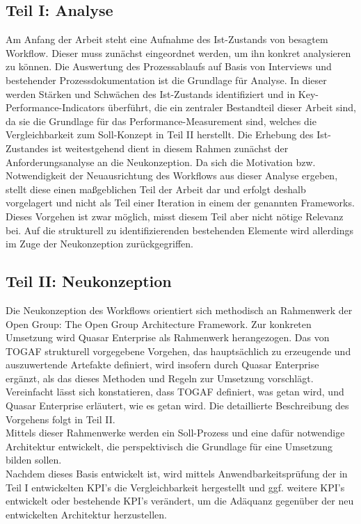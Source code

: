\subsection{Teil I: Analyse}

Am Anfang der Arbeit steht eine Aufnahme des Ist-Zustands von besagtem Workflow. Dieser muss zunächst eingeordnet werden, um ihn konkret analysieren zu können. 
Die Auswertung des Prozessablaufs auf Basis von Interviews und bestehender Prozessdokumentation ist die Grundlage für Analyse. 
In dieser werden Stärken und Schwächen des Ist-Zustands identifiziert und in Key-Performance-Indicators überführt, die ein zentraler Bestandteil dieser Arbeit sind, da sie die Grundlage für das Performance-Measurement sind, welches die Vergleichbarkeit zum Soll-Konzept in Teil II herstellt.
Die Erhebung des Ist-Zustandes ist weitestgehend dient in diesem Rahmen zunächst der Anforderungsanalyse an die Neukonzeption. 
Da sich die Motivation bzw. Notwendigkeit der Neuausrichtung des Workflows aus dieser Analyse ergeben, stellt diese einen maßgeblichen Teil der Arbeit dar und erfolgt deshalb vorgelagert und nicht als Teil einer Iteration in einem der genannten Frameworks.
Dieses Vorgehen ist zwar möglich, misst diesem Teil aber nicht nötige Relevanz bei.
Auf die strukturell zu identifizierenden bestehenden Elemente wird allerdings im Zuge der Neukonzeption zurückgegriffen.

\subsection{Teil II: Neukonzeption}

Die Neukonzeption des Workflows orientiert sich methodisch an Rahmenwerk der Open Group: The Open Group Architecture Framework. 
Zur konkreten Umsetzung wird Quasar Enterprise als Rahmenwerk herangezogen. 
Das von TOGAF strukturell vorgegebene Vorgehen, das hauptsächlich zu erzeugende und auszuwertende Artefakte definiert, wird insofern durch Quasar Enterprise ergänzt, als das dieses Methoden und Regeln zur Umsetzung vorschlägt. 
Vereinfacht lässt sich konstatieren, dass TOGAF definiert, was getan wird, und Quasar Enterprise erläutert, wie es getan wird. 
Die detaillierte Beschreibung des Vorgehens folgt in Teil II.\\
Mittels dieser Rahmenwerke werden ein Soll-Prozess und eine dafür notwendige Architektur entwickelt, die perspektivisch die Grundlage für eine Umsetzung bilden sollen.\\
Nachdem dieses Basis entwickelt ist, wird mittels Anwendbarkeitsprüfung der in Teil I entwickelten KPI's die Vergleichbarkeit hergestellt und ggf. weitere KPI's entwickelt oder bestehende KPI's verändert, um die Adäquanz gegenüber der neu entwickelten Architektur herzustellen.\\

